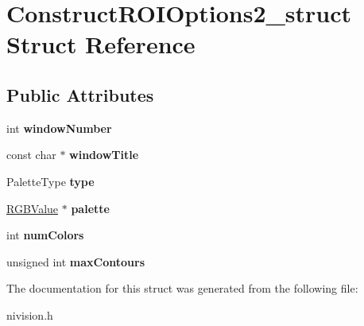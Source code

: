 \hypertarget{structConstructROIOptions2__struct}{
\section{ConstructROIOptions2\_\-struct Struct Reference}
\label{structConstructROIOptions2__struct}
}
\subsection*{Public Attributes}
\begin{DoxyCompactItemize}
\item 
\hypertarget{structConstructROIOptions2__struct_ae7d105748ce09c852b2f795819a5b2c4}{
int {\bfseries windowNumber}}
\label{structConstructROIOptions2__struct_ae7d105748ce09c852b2f795819a5b2c4}

\item 
\hypertarget{structConstructROIOptions2__struct_aee9c7095532d220af8a9c57867ea6f09}{
const char $\ast$ {\bfseries windowTitle}}
\label{structConstructROIOptions2__struct_aee9c7095532d220af8a9c57867ea6f09}

\item 
\hypertarget{structConstructROIOptions2__struct_a1bb83c019e90d6f09ed4ab71e411d099}{
PaletteType {\bfseries type}}
\label{structConstructROIOptions2__struct_a1bb83c019e90d6f09ed4ab71e411d099}

\item 
\hypertarget{structConstructROIOptions2__struct_a62b94cc293de4bb419329f04973fd398}{
\hyperlink{structRGBValue__struct}{RGBValue} $\ast$ {\bfseries palette}}
\label{structConstructROIOptions2__struct_a62b94cc293de4bb419329f04973fd398}

\item 
\hypertarget{structConstructROIOptions2__struct_a3eec167ec42dbaec506fde40db6129a7}{
int {\bfseries numColors}}
\label{structConstructROIOptions2__struct_a3eec167ec42dbaec506fde40db6129a7}

\item 
\hypertarget{structConstructROIOptions2__struct_a7269dc54416d03a77189518976963d85}{
unsigned int {\bfseries maxContours}}
\label{structConstructROIOptions2__struct_a7269dc54416d03a77189518976963d85}

\end{DoxyCompactItemize}


The documentation for this struct was generated from the following file:\begin{DoxyCompactItemize}
\item 
nivision.h\end{DoxyCompactItemize}
